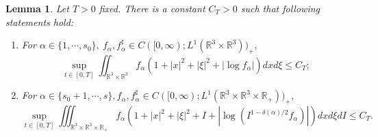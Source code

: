 \documentclass[reqno,11pt]{amsart}
\newtheorem{lemma}{Lemma}[section]
\numberwithin{equation}{section}
\def\R{\mathbb{R}}
\begin{document}
\begin{lemma}\label{cor6.12}
Let $T > 0$ fixed. There is a constant $C_T > 0$ such that following statements hold:
\begin{enumerate}
\item {For $\alpha \in \{1,\cdots,s_0\},\ f_\alpha, f^\sharp_\alpha \in C([0,\infty); L^1 (\R^3 \times \R^3))_+,$
		\begin{equation}
		\sup_{t \in [0, T]} \iint_{\R^3 \times \R^3 } f_\alpha (1+|x|^2 +|\xi|^2 +|\log f_\alpha|)dxd\xi \leq C_T;
		\end{equation}	}
\item{For $\alpha \in \{s_0+1,\cdots,s\},f_\alpha,f^\sharp_\alpha \in C([0,\infty); L^1 (\R^3 \times \R^3\times \R_+))_+,$
	\begin{equation}\label{falpha-bnd}
	\sup_{t \in [0, T]} \iiint_{\R^3 \times \R^3 \times \R_+} f_\alpha (1+|x|^2 +|\xi|^2 +I + |\log (I^{1-\delta(\alpha)/2}f_\alpha)|)dxd\xi dI \leq C_T.
	\end{equation}}
\end{enumerate}
\end{lemma}
\end{document}
